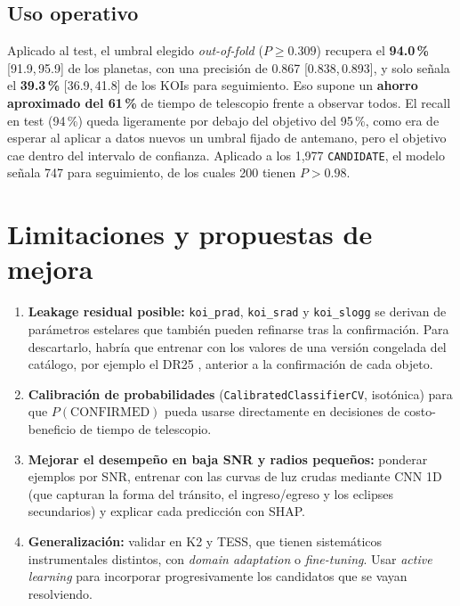 \documentclass[11pt,a4paper]{article}
\newcommand{\ci}[2]{{\footnotesize[#1,\,#2]}}
\begin{document}
\subsection{Uso operativo}
Aplicado al test, el umbral elegido \textit{out-of-fold} ($P\geq0.309$) recupera el \textbf{94.0\,\%} \ci{91.9}{95.9} de los planetas, con una precisión de 0.867 \ci{0.838}{0.893}, y solo señala el \textbf{39.3\,\%} \ci{36.9}{41.8} de los KOIs para seguimiento. Eso supone un \textbf{ahorro aproximado del 61\,\%} de tiempo de telescopio frente a observar todos. El recall en test (94\,\%) queda ligeramente por debajo del objetivo del 95\,\%, como era de esperar al aplicar a datos nuevos un umbral fijado de antemano, pero el objetivo cae dentro del intervalo de confianza. Aplicado a los 1,977 \texttt{CANDIDATE}, el modelo señala 747 para seguimiento, de los cuales 200 tienen $P>0.98$.

\section{Limitaciones y propuestas de mejora}
\begin{enumerate}
\item \textbf{Leakage residual posible:} \texttt{koi\_prad}, \texttt{koi\_srad} y \texttt{koi\_slogg} se derivan de parámetros estelares que también pueden refinarse tras la confirmación. Para descartarlo, habría que entrenar con los valores de una versión congelada del catálogo, por ejemplo el DR25 \cite{thompson2018}, anterior a la confirmación de cada objeto.
\item \textbf{Calibración de probabilidades} (\texttt{CalibratedClassifierCV}, isotónica) para que $P(\text{CONFIRMED})$ pueda usarse directamente en decisiones de costo-beneficio de tiempo de telescopio.
\item \textbf{Mejorar el desempeño en baja SNR y radios pequeños:} ponderar ejemplos por SNR, entrenar con las curvas de luz crudas mediante CNN 1D (que capturan la forma del tránsito, el ingreso/egreso y los eclipses secundarios) y explicar cada predicción con SHAP.
\item \textbf{Generalización:} validar en K2 y TESS, que tienen sistemáticos instrumentales distintos, con \textit{domain adaptation} o \textit{fine-tuning}. Usar \textit{active learning} para incorporar progresivamente los candidatos que se vayan resolviendo.
\end{enumerate}
\end{document}
